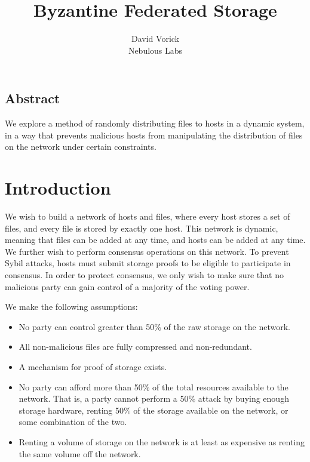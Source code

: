 \documentclass[twocolumn]{article}
\begin{document}
\frenchspacing

\title{Byzantine Federated Storage}

\author{
{\rm David Vorick}\\
Nebulous Labs
}

\maketitle

\subsection*{Abstract}
We explore a method of randomly distributing files to hosts in a dynamic system, in a way that prevents malicious hosts from manipulating the distribution of files on the network under certain constraints.

\section{Introduction}
We wish to build a network of hosts and files, where every host stores a set of files, and every file is stored by exactly one host.
This network is dynamic, meaning that files can be added at any time, and hosts can be added at any time.
We further wish to perform consensus operations on this network.
To prevent Sybil attacks, hosts must submit storage proofs to be eligible to participate in consensus.
In order to protect consensus, we only wish to make sure that no malicious party can gain control of a majority of the voting power.

We make the following assumptions:
\begin{itemize}
	\item No party can control greater than 50\% of the raw storage on the network.
	\item All non-malicious files are fully compressed and non-redundant.
	\item A mechanism for proof of storage exists.
	\item No party can afford more than 50\% of the total resources available to the network. That is, a party cannot perform a 50\% attack by buying enough storage hardware, renting 50\% of the storage available on the network, or some combination of the two.
	\item Renting a volume of storage on the network is at least as expensive as renting the same volume off the network.
\end{itemize}
\end{document}
